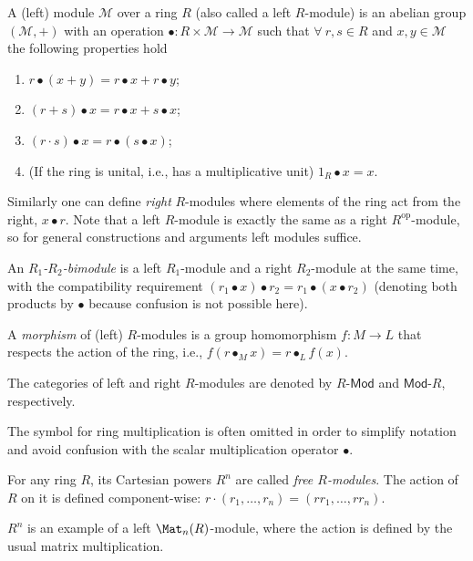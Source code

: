 \begin{defn}
    A (left) module $\mathcal{M}$ over a ring $R$ (also called a left
    $R$-module) is an abelian group $(\mathcal{M},+)$ with an operation
    $\bullet:R\times\mathcal{M}\rightarrow\mathcal{M}$ such that $\forall~r,s\in R$
    and $x,y\in\mathcal{M}$ the following properties hold 
    \begin{enumerate}
    \item $r\bullet(x+y)=r\bullet x+r\bullet y$;
    \item $(r+s)\bullet x=r\bullet x+s\bullet x$;
    \item $(r\cdot s)\bullet x=r\bullet(s\bullet x)$;
    \item (If the ring is unital, i.e., has a multiplicative unit)
    $1_{R}\bullet x=x$. 
    \end{enumerate}
    Similarly one can define \emph{right} $R$-modules where elements
    of the ring act from the right, $x\bullet r$. Note that a left $R$-module
    is exactly the same as a right $R^{\mathrm{op}}$-module, so for general constructions
    and arguments left modules suffice.

    An $R_{1}$\emph{-$R_{2}$-bimodule} is a left $R_{1}$-module and
    a right $R_{2}$-module at the same time, with the compatibility requirement
    $\left(r_{1}\bullet x\right)\bullet r_{2}=r_{1}\bullet\left(x\bullet r_{2}\right)$
    (denoting both products by $\bullet$ because confusion is not possible
    here).

    A \emph{morphism} of (left) $R$-modules is a group homomorphism
    $f:M\to L$ that respects the action of the ring, i.e., $f\left(r\bullet_{M}x\right)=r\bullet_{L}f\left(x\right)$.

    The categories of left and right $R$-modules are denoted by $R\text{-}\mathsf{Mod}$
    and $\mathsf{Mod}\text{-}R$, respectively.
\end{defn}
The symbol for ring multiplication is often omitted in order to simplify
notation and avoid confusion with the scalar multiplication operator
$\bullet$.
\begin{example}
    For any ring $R$, its Cartesian powers $R^{n}$ are called \emph{free
    $R$-modules}. The action of $R$ on it is defined component-wise:
    $r\cdot\left(r_{1},\ldots,r_{n}\right)=\left(rr_{1},\ldots,rr_{n}\right)$.
\end{example}
%
\begin{example}
    $R^{n}$ is an example of a left $\Mat_n(R)$-module,
    where the action is defined by the usual matrix multiplication.
\end{example}
